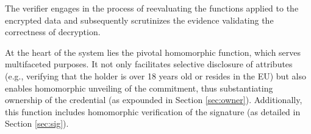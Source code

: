 
The verifier engages in the process of reevaluating the functions applied to the encrypted data and subsequently scrutinizes the evidence validating the correctness of decryption.

At the heart of the system lies the pivotal homomorphic function, which serves multifaceted purposes. It not only facilitates selective disclosure of attributes (e.g., verifying that the holder is over 18 years old or resides in the EU) but also enables homomorphic unveiling of the commitment, thus substantiating ownership of the credential (as expounded in Section \ref{sec:owner}). Additionally, this function includes homomorphic verification of the signature (as detailed in Section \ref{sec:sig}).


